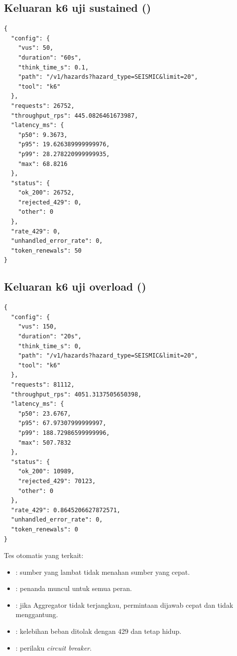 \subsection*{Keluaran k6 uji sustained ()}
\begin{lstlisting}
{
  "config": {
    "vus": 50,
    "duration": "60s",
    "think_time_s": 0.1,
    "path": "/v1/hazards?hazard_type=SEISMIC&limit=20",
    "tool": "k6"
  },
  "requests": 26752,
  "throughput_rps": 445.0826461673987,
  "latency_ms": {
    "p50": 9.3673,
    "p95": 19.626389999999976,
    "p99": 28.278220999999935,
    "max": 68.8216
  },
  "status": {
    "ok_200": 26752,
    "rejected_429": 0,
    "other": 0
  },
  "rate_429": 0,
  "unhandled_error_rate": 0,
  "token_renewals": 50
}
\end{lstlisting}

\subsection*{Keluaran k6 uji overload ()}
\begin{lstlisting}
{
  "config": {
    "vus": 150,
    "duration": "20s",
    "think_time_s": 0,
    "path": "/v1/hazards?hazard_type=SEISMIC&limit=20",
    "tool": "k6"
  },
  "requests": 81112,
  "throughput_rps": 4051.3137505650398,
  "latency_ms": {
    "p50": 23.6767,
    "p95": 67.97307999999997,
    "p99": 188.72986599999996,
    "max": 507.7832
  },
  "status": {
    "ok_200": 10989,
    "rejected_429": 70123,
    "other": 0
  },
  "rate_429": 0.8645206627872571,
  "unhandled_error_rate": 0,
  "token_renewals": 0
}
\end{lstlisting}

Tes otomatis yang terkait:
\begin{itemize}
 \item {}: sumber yang lambat tidak menahan sumber yang cepat.
 \item {}: penanda  muncul untuk semua peran.
 \item {}: jika Aggregator tidak terjangkau, permintaan dijawab cepat dan tidak menggantung.
 \item {}: kelebihan beban ditolak dengan 429 dan  tetap hidup.
 \item {}: perilaku \emph{circuit breaker}.
\end{itemize}

